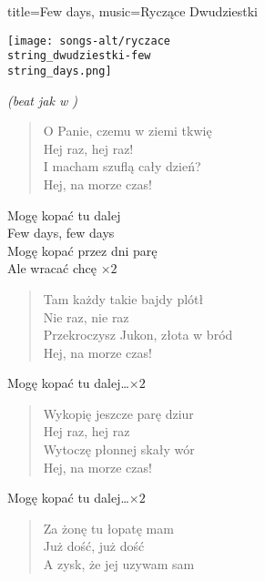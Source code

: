 \newpage
\begin{song}{title={Few days}, music={Ryczące Dwudziestki}}
    \medskip
    \begin{adjustbox}{width={\textwidth}, keepaspectratio}
        \texttt{[image: songs-alt/ryczace\\string\_dwudziestki-few\\string\_days.png]}
    \end{adjustbox}
    \begin{info}
        \textit{(beat jak w )}
    \end{info}
    \begin{multicols}{2}
    \begin{verse}
        O Panie, czemu w ziemi tkwię \\
		Hej raz, hej raz! \\
		I macham szuflą cały dzień? \\
		Hej, na morze czas! 
    \end{verse}
    \begin{chorus}
        Mogę kopać tu dalej \\
		Few days, few days \\
		Mogę kopać przez dni parę \\ 
		Ale wracać chcę  $\times 2$ 
    \end{chorus}
    \begin{verse}
        Tam każdy takie bajdy plótł \\
		Nie raz, nie raz \\
		Przekroczysz Jukon, złota w bród \\
		Hej, na morze czas! 
    \end{verse}
    \begin{chorus}
        Mogę kopać tu dalej\ldots $\times 2$ 
    \end{chorus}
    \begin{verse}
        Wykopię jeszcze parę dziur \\
		Hej raz, hej raz \\
		Wytoczę płonnej skały wór \\
		Hej, na morze czas!
    \end{verse}
    \begin{chorus}
        Mogę kopać tu dalej\ldots $\times 2$ 
    \end{chorus}
    \begin{verse}
        Za żonę tu łopatę mam \\
		Już dość, już dość \\
		A zysk, że jej uzywam sam \\

\end{verse}
\end{multicols}
\end{song}
